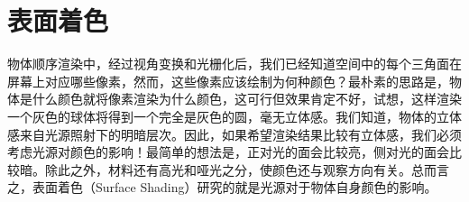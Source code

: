 \chapter{表面着色}

物体顺序渲染中，经过视角变换和光栅化后，我们已经知道空间中的每个三角面在屏幕上对应哪些像素，然而，这些像素应该绘制为何种颜色？最朴素的思路是，物体是什么颜色就将像素渲染为什么颜色，这可行但效果肯定不好，试想，这样渲染一个灰色的球体将得到一个完全是灰色的圆，毫无立体感。我们知道，物体的立体感来自光源照射下的明暗层次。因此，如果希望渲染结果比较有立体感，我们必须考虑光源对颜色的影响！最简单的想法是，正对光的面会比较亮，侧对光的面会比较暗。除此之外，材料还有高光和哑光之分，使颜色还与观察方向有关。总而言之，表面着色（Surface Shading）研究的就是光源对于物体自身颜色的影响。





\newpage



